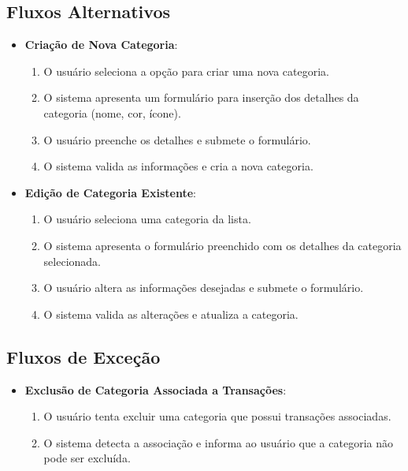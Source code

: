 \subsection*{Fluxos Alternativos}
\begin{addmargin}[1.5cm]{0cm}
    \begin{itemize}
        \item \textbf{Criação de Nova Categoria}:
        \begin{enumerate}
            \item O usuário seleciona a opção para criar uma nova categoria.
            \item O sistema apresenta um formulário para inserção dos detalhes da categoria (nome, cor, ícone).
            \item O usuário preenche os detalhes e submete o formulário.
            \item O sistema valida as informações e cria a nova categoria.
        \end{enumerate}
        
        \item \textbf{Edição de Categoria Existente}:
        \begin{enumerate}
            \item O usuário seleciona uma categoria da lista.
            \item O sistema apresenta o formulário preenchido com os detalhes da categoria selecionada.
            \item O usuário altera as informações desejadas e submete o formulário.
            \item O sistema valida as alterações e atualiza a categoria.
        \end{enumerate}
    \end{itemize}
\end{addmargin}

\subsection*{Fluxos de Exceção}
\begin{addmargin}[1.5cm]{0cm}
    \begin{itemize}
        \item \textbf{Exclusão de Categoria Associada a Transações}:
        \begin{enumerate}
            \item O usuário tenta excluir uma categoria que possui transações associadas.
            \item O sistema detecta a associação e informa ao usuário que a categoria não pode ser excluída.
        \end{enumerate}
    \end{itemize}
\end{addmargin}

